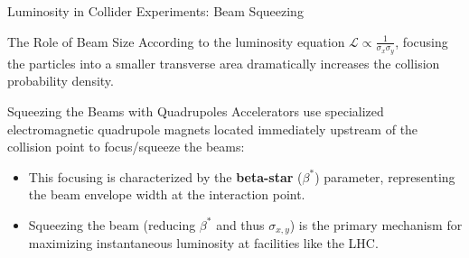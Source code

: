 \documentclass[aspectratio=169]{beamer}
\begin{document}
\begin{frame}{Luminosity in Collider Experiments: Beam Squeezing}
    \begin{block}{The Role of Beam Size}
        According to the luminosity equation $\mathcal{L} \propto \frac{1}{\sigma_x \sigma_y}$, focusing the particles into a smaller transverse area dramatically increases the collision probability density.
    \end{block}
    \begin{block}{Squeezing the Beams with Quadrupoles}
        Accelerators use specialized electromagnetic quadrupole magnets located immediately upstream of the collision point to focus/squeeze the beams:
        \begin{itemize}
            \item This focusing is characterized by the \textbf{beta-star} ($\beta^*$) parameter, representing the beam envelope width at the interaction point.
            \item Squeezing the beam (reducing $\beta^*$ and thus $\sigma_{x,y}$) is the primary mechanism for maximizing instantaneous luminosity at facilities like the LHC.
        \end{itemize}
    \end{block}
\end{frame}
\end{document}
